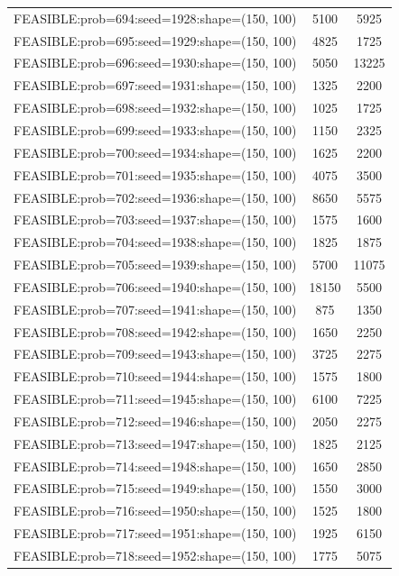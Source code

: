 \begin{longtable}{lcc}
FEASIBLE:prob=694:seed=1928:shape=(150, 100) &     5100 &  5925 \\
FEASIBLE:prob=695:seed=1929:shape=(150, 100) &     4825 &  1725 \\
FEASIBLE:prob=696:seed=1930:shape=(150, 100) &     5050 & 13225 \\
FEASIBLE:prob=697:seed=1931:shape=(150, 100) &     1325 &  2200 \\
FEASIBLE:prob=698:seed=1932:shape=(150, 100) &     1025 &  1725 \\
FEASIBLE:prob=699:seed=1933:shape=(150, 100) &     1150 &  2325 \\
FEASIBLE:prob=700:seed=1934:shape=(150, 100) &     1625 &  2200 \\
FEASIBLE:prob=701:seed=1935:shape=(150, 100) &     4075 &  3500 \\
FEASIBLE:prob=702:seed=1936:shape=(150, 100) &     8650 &  5575 \\
FEASIBLE:prob=703:seed=1937:shape=(150, 100) &     1575 &  1600 \\
FEASIBLE:prob=704:seed=1938:shape=(150, 100) &     1825 &  1875 \\
FEASIBLE:prob=705:seed=1939:shape=(150, 100) &     5700 & 11075 \\
FEASIBLE:prob=706:seed=1940:shape=(150, 100) &    18150 &  5500 \\
FEASIBLE:prob=707:seed=1941:shape=(150, 100) &      875 &  1350 \\
FEASIBLE:prob=708:seed=1942:shape=(150, 100) &     1650 &  2250 \\
FEASIBLE:prob=709:seed=1943:shape=(150, 100) &     3725 &  2275 \\
FEASIBLE:prob=710:seed=1944:shape=(150, 100) &     1575 &  1800 \\
FEASIBLE:prob=711:seed=1945:shape=(150, 100) &     6100 &  7225 \\
FEASIBLE:prob=712:seed=1946:shape=(150, 100) &     2050 &  2275 \\
FEASIBLE:prob=713:seed=1947:shape=(150, 100) &     1825 &  2125 \\
FEASIBLE:prob=714:seed=1948:shape=(150, 100) &     1650 &  2850 \\
FEASIBLE:prob=715:seed=1949:shape=(150, 100) &     1550 &  3000 \\
FEASIBLE:prob=716:seed=1950:shape=(150, 100) &     1525 &  1800 \\
FEASIBLE:prob=717:seed=1951:shape=(150, 100) &     1925 &  6150 \\
FEASIBLE:prob=718:seed=1952:shape=(150, 100) &     1775 &  5075 \\

\end{longtable}
